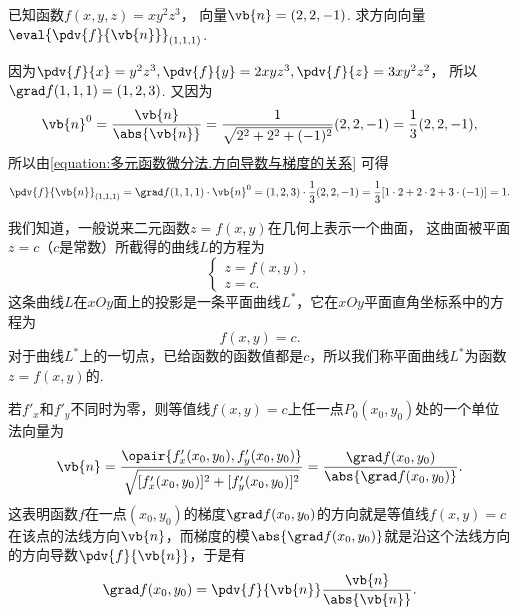 \begin{example}
已知函数\(f(x,y,z) = x y^2 z^3\)，
向量\(\vb{n} = (2,2,-1)\).
求方向向量\(\eval{\pdv{f}{\vb{n}}}_{(1,1,1)}\).
\begin{solution}
因为\(\pdv{f}{x} = y^2 z^3,
\pdv{f}{y} = 2 x y z^3,
\pdv{f}{z} = 3 x y^2 z^2\)，
所以\(\grad f(1,1,1) = (1,2,3)\).
又因为\begin{equation*}
	\vb{n}^0
	= \frac{\vb{n}}{\abs{\vb{n}}}
	= \frac1{\sqrt{2^2+2^2+(-1)^2}} (2,2,-1)
	= \frac13 (2,2,-1),
\end{equation*}
所以由\cref{equation:多元函数微分法.方向导数与梯度的关系} 可得\begin{equation*}
	\pdv{f}{\vb{n}}_{(1,1,1)}
	= \grad f(1,1,1) \cdot \vb{n}^0
	= (1,2,3) \cdot \frac13 (2,2,-1)
	= \frac13 [1\cdot2+2\cdot2+3\cdot(-1)]
	= 1.
\end{equation*}
\end{solution}
\end{example}

我们知道，一般说来二元函数\(z = f(x,y)\)在几何上表示一个曲面，
这曲面被平面\(z = c\)（\(c\)是常数）所截得的曲线\(L\)的方程为\begin{equation*}
\left\{ \begin{array}{l}
z = f(x,y), \\
z = c.
\end{array} \right.
\end{equation*}这条曲线\(L\)在\(xOy\)面上的投影是一条平面曲线\(L^*\)，它在\(xOy\)平面直角坐标系中的方程为\begin{equation*}
f(x,y) = c.
\end{equation*}对于曲线\(L^*\)上的一切点，已给函数的函数值都是\(c\)，所以我们称平面曲线\(L^*\)为函数\(z = f(x,y)\)的.

若\(f'_x\)和\(f'_y\)不同时为零，则等值线\(f(x,y) = c\)上任一点\(P_0(x_0,y_0)\)处的一个单位法向量为\begin{equation*}
\vb{n}
= \frac{\opair{f'_x(x_0,y_0),f'_y(x_0,y_0)}}{\sqrt{[f'_x(x_0,y_0)]^2+[f'_y(x_0,y_0)]^2}}
= \frac{\grad f(x_0,y_0)}{\abs{\grad f(x_0,y_0)}}.
\end{equation*}
这表明函数\(f\)在一点\((x_0,y_0)\)的梯度\(\grad f(x_0,y_0)\)的方向就是等值线\(f(x,y) = c\)在该点的法线方向\(\vb{n}\)，而梯度的模\(\abs{\grad f(x_0,y_0)}\)就是沿这个法线方向的方向导数\(\pdv{f}{\vb{n}}\)，于是有\begin{equation*}
\grad f(x_0,y_0) = \pdv{f}{\vb{n}} \frac{\vb{n}}{\abs{\vb{n}}}.
\end{equation*}

